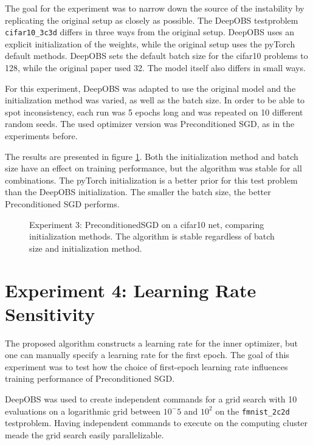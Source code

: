 \documentclass[twoside,12pt,a4paper]{report}
\begin{document}
The goal for the experiment was to narrow down the source of the instability by replicating the original setup as closely as possible. The DeepOBS testproblem \verb|cifar10_3c3d| differs in three ways from the original setup. DeepOBS uses an explicit initialization of the weights, while the original setup uses the pyTorch default methods. DeepOBS sets the default batch size for the cifar10 problems to 128, while the original paper used 32. The model itself also differs in small ways.

For this experiment, DeepOBS was adapted to use the original model and the initialization method was varied, as well as the batch size. In order to be able to spot inconsistency, each run was 5 epochs long and was repeated on 10 different random seeds. The used optimizer version was Preconditioned SGD, as in the experiments before.

The results are presented in figure \ref{fig:exp_init}. Both the initialization method and batch size have an effect on training performance, but the algorithm was stable for all combinations. The pyTorch initialization is a better prior for this test problem than the DeepOBS initialization. The smaller the batch size, the better Preconditioned SGD performs.

\begin{figure}
	\centering \hspace{-1,5cm}
	
	\caption{Experiment 3: PreconditionedSGD on a cifar10 net, comparing initialization methods. The algorithm is stable regardless of batch size and initialization method.}
	\label{fig:exp_init}
\end{figure}


\section{Experiment 4: Learning Rate Sensitivity}
The proposed algorithm constructs a learning rate for the inner optimizer, but one can manually specify a learning rate for the first epoch.
The goal of this experiment was to test how the choice of first-epoch learning rate influences training performance of Preconditioned SGD.

DeepOBS was used to create independent commands for a grid search with 10 evaluations on a logarithmic grid between $10^-5$ and $10^2$ on the \verb|fmnist_2c2d| testproblem. Having independent commands to execute on the computing cluster meade the grid search easily parallelizable.
\end{document}
